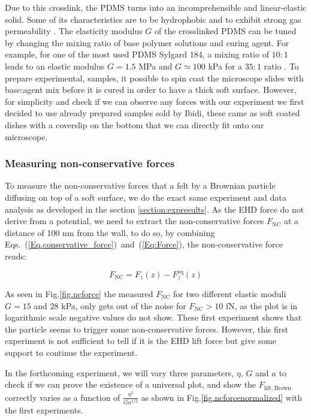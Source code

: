 Due to this crosslink, the \gls{PDMS} turns into an incomprehensible and linear-elastic solid. Some of its characteristics are to be hydrophobic and to exhibit strong gas permeability \cite{xia_soft_1998}. The elasticity modulus $G$ of the crosslinked \gls{PDMS} can be tuned by changing the mixing ratio of base polymer solutions and curing agent. For example, for one of the most used \gls{PDMS} Sylgard 184, a mixing ratio of $10:1$ leads to an elastic modulus $G=1.5$ MPa and $G\simeq 100$ kPa for a $35:1$ ratio \cite{wang_crosslinking_2014}. To prepare experimental, samples, it possible to spin coat the microscope slides with base:agent mix before it is cured in order to have a thick soft surface. However, for simplicity and check if we can observe any forces with our experiment we first decided to use already prepared samples sold by Ibidi, these came as soft coated dishes with a coverslip on the bottom that we can directly fit onto our microscope.


\subsubsection{Measuring non-conservative forces}

To measure the non-conservative forces that a felt by a Brownian particle diffusing on top of a soft surface, we do the exact same experiment and data analysis as developed in the section \ref{section:expresults}. As the \gls{EHD} force do not derive from a potential, we need to extract the non-conservative forces $F_\mathrm{NC}$ at a distance of 100 nm from the wall, to do so, by combining Eqs.~(\ref{Eq.conservative_force})~and~(\ref{Eq:Force}), the non-conservative force reads:

\begin{equation}
	F_\mathrm{NC} = F_z(z) - F_z ^\mathrm{eq}(z)
\end{equation}

As seen in Fig.\ref{fig.ncforce} the measured $F_\mathrm{NC}$ for two different elastic moduli $G=15$ and $28$ kPa, only gets out of the noise for $F_\mathrm{NC} > 10$ fN, as the plot is in logarithmic scale negative values do not show. These first experiment shows that the particle seems to trigger some non-conservative forces. However, this first experiment is not sufficient to tell if it is the \gls{EHD} lift force but give some support to continue the experiment.

In the forthcoming experiment, we will vary three parameters, $\eta$, $G$ and $a$ to check if we can prove the existence of a universal plot, and show the $F_\mathrm{lift, Brown}$ correctly varies as a function of $\frac{\eta^2}{Ga^{1/2}} $ as shown in Fig.\ref{fig.ncforcenormalized} with the first experiments.


